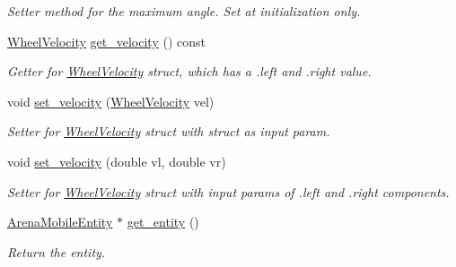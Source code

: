 \begin{DoxyCompactItemize}
\begin{DoxyCompactList}\small\item\em Setter method for the maximum angle. Set at initialization only. \end{DoxyCompactList}\item 
\mbox{\label{class_motion_handler_abe03a52474984233d1867405925a4102}} 
\mbox{\hyperlink{struct_wheel_velocity}{Wheel\+Velocity}} \mbox{\hyperlink{class_motion_handler_abe03a52474984233d1867405925a4102}{get\+\_\+velocity}} () const
\begin{DoxyCompactList}\small\item\em Getter for \mbox{\hyperlink{struct_wheel_velocity}{Wheel\+Velocity}} struct, which has a .left and .right value. \end{DoxyCompactList}\item 
\mbox{\label{class_motion_handler_ac4bf67ba783c1afb5a5839229de3f3f9}} 
void \mbox{\hyperlink{class_motion_handler_ac4bf67ba783c1afb5a5839229de3f3f9}{set\+\_\+velocity}} (\mbox{\hyperlink{struct_wheel_velocity}{Wheel\+Velocity}} vel)
\begin{DoxyCompactList}\small\item\em Setter for \mbox{\hyperlink{struct_wheel_velocity}{Wheel\+Velocity}} struct with struct as input param. \end{DoxyCompactList}\item 
\mbox{\label{class_motion_handler_af31975aa667ca20835e4d5bb0216706e}} 
void \mbox{\hyperlink{class_motion_handler_af31975aa667ca20835e4d5bb0216706e}{set\+\_\+velocity}} (double vl, double vr)
\begin{DoxyCompactList}\small\item\em Setter for \mbox{\hyperlink{struct_wheel_velocity}{Wheel\+Velocity}} struct with input params of .left and .right components. \end{DoxyCompactList}\item 
\mbox{\label{class_motion_handler_ad8472612d15be1ada7f919f45d245adc}} 
\mbox{\hyperlink{class_arena_mobile_entity}{Arena\+Mobile\+Entity}} $\ast$ \mbox{\hyperlink{class_motion_handler_ad8472612d15be1ada7f919f45d245adc}{get\+\_\+entity}} ()
\begin{DoxyCompactList}\small\item\em Return the entity. \end{DoxyCompactList}\end{DoxyCompactItemize}
